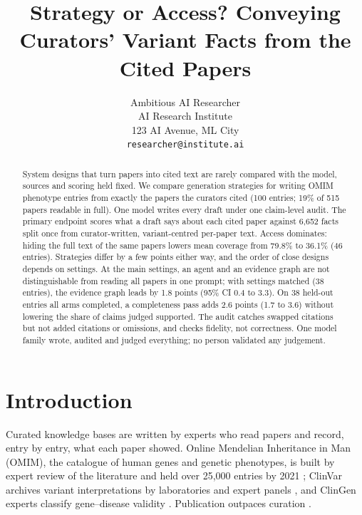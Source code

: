 \documentclass{article} %
\title{Strategy or Access? Conveying Curators' Variant Facts from the Cited Papers}
\author{Ambitious AI Researcher\\
AI Research Institute\\
123 AI Avenue, ML City\\
\texttt{researcher@institute.ai}
}
\begin{document}
\maketitle

\begin{abstract}
System designs that turn papers into cited text are rarely compared with the model, sources and scoring held fixed. We compare generation strategies for writing OMIM phenotype entries from exactly the papers the curators cited (100 entries; 19\% of 515 papers readable in full). One model writes every draft under one claim-level audit. The primary endpoint scores what a draft says about each cited paper against 6,652 facts split once from curator-written, variant-centred per-paper text. Access dominates: hiding the full text of the same papers lowers mean coverage from 79.8\% to 36.1\% (46 entries). Strategies differ by a few points either way, and the order of close designs depends on settings. At the main settings, an agent and an evidence graph are not distinguishable from reading all papers in one prompt; with settings matched (38 entries), the evidence graph leads by 1.8 points (95\% CI 0.4 to 3.3). On 38 held-out entries all arms completed, a completeness pass adds 2.6 points (1.7 to 3.6) without lowering the share of claims judged supported. The audit catches swapped citations but not added citations or omissions, and checks fidelity, not correctness. One model family wrote, audited and judged everything; no person validated any judgement.
\end{abstract}

\section{Introduction}
\label{sec:intro}
Curated knowledge bases are written by experts who read papers and record, entry by entry, what each paper showed. Online Mendelian Inheritance in Man (OMIM), the catalogue of human genes and genetic phenotypes, is built by expert review of the literature and held over 25,000 entries by 2021 \citep{Amberger2014OmimorgOnline,amberger2019omim,hamosh2021online}; ClinVar archives variant interpretations by laboratories and expert panels \citep{Landrum2017ClinvarImproving,landrum2025clinvar}, and ClinGen experts classify gene--disease validity \citep{strande2017evaluating}. Publication outpaces curation \citep{caufield2024curategpt,Green2023LitsummLarge}.
\end{document}
